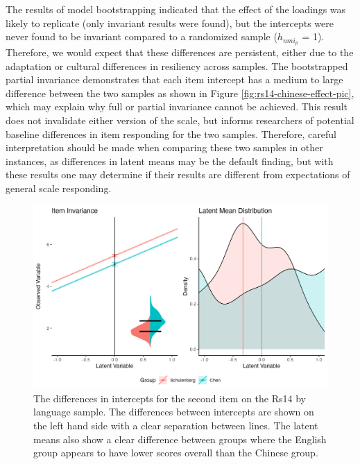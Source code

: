 \documentclass[
  man]{apa7}
\begin{document}
The results of model bootstrapping indicated that the effect of the loadings was likely to replicate (only invariant results were found), but the intercepts were never found to be invariant compared to a randomized sample (\(h_{nmi_p}\) = 1). Therefore, we would expect that these differences are persistent, either due to the adaptation or cultural differences in resiliency across samples. The bootstrapped partial invariance demonstrates that each item intercept has a medium to large difference between the two samples as shown in Figure \ref{fig:rs14-chinese-effect-pic}, which may explain why full or partial invariance cannot be achieved. This result does not invalidate either version of the scale, but informs researchers of potential baseline differences in item responding for the two samples. Therefore, careful interpretation should be made when comparing these two samples in other instances, as differences in latent means may be the default finding, but with these results one may determine if their results are different from expectations of general scale responding.

\begin{figure}
\includegraphics[width=8in]{figures/rs14-chinese-RS2} \caption{The differences in intercepts for the second item on the Rs14 by language sample. The differences between intercepts are shown on the left hand side with a clear separation between lines. The latent means also show a clear difference between groups where the English group appears to have lower scores overall than the Chinese group.}\label{fig:rs14-chinese-pic}
\end{figure}
\end{document}
